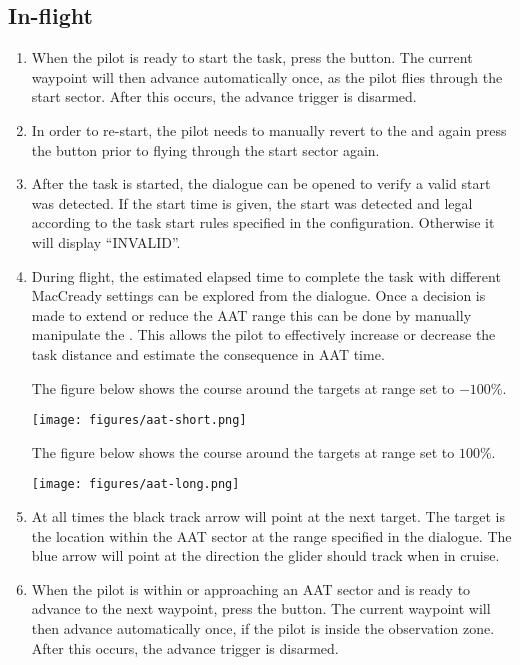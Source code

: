 \subsection*{In-flight}
\begin{enumerate}
\item  When the pilot is ready to start the task, press the  button.  The current waypoint will then advance automatically
  once, as the pilot flies through the start sector.  After this occurs, 
  the advance trigger is disarmed.  
\item  In order to re-start, the pilot needs to manually revert to the
 and again press the  button prior to
  flying through the start sector again.
\item  After the task is started, the  dialogue can be opened to
  verify a valid start was detected. If the start time is given, the start was 
  detected and legal according to the task start rules specified in the 
  configuration.  Otherwise it will display ``INVALID''.
\item  During flight, the estimated elapsed time to complete the task with
  different MacCready settings can be explored from the  dialogue.
  Once a decision is made to extend or reduce the AAT range this can be done by
  manually manipulate the . This allows the pilot to effectively 
  increase or decrease the task distance and estimate the consequence in AAT time.

The figure below shows the course around the targets at range set to $-100$\%.
\begin{center}
\texttt{[image: figures/aat-short.png]}
\end{center}

The figure below shows the course around the targets at range set to $100$\%.
\begin{center}
\texttt{[image: figures/aat-long.png]}
\end{center}

\item  At all times the black track arrow will point at the next target.  The
  target is the location within the AAT sector at the range specified in
  the  dialogue.  The blue arrow will point at the direction
  the glider should track when in cruise.

\item  When the pilot is within or approaching an AAT sector and is ready to
  advance to the next waypoint, press the  button.  The
  current waypoint will then advance automatically once, if the pilot is
  inside the observation zone.  After this occurs, the advance trigger
  is disarmed.


\end{enumerate}

